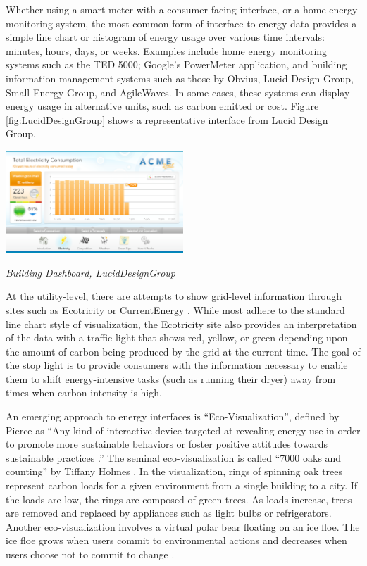 Whether using a smart meter with a consumer-facing interface, or a home
energy monitoring system, the most common form of interface to energy data
provides a simple line chart or histogram of energy usage over various time
intervals: minutes, hours, days, or weeks.  Examples include home energy
monitoring systems such as the TED 5000; Google's PowerMeter application,
and building information management systems such as those by Obvius, Lucid
Design Group, Small Energy Group, and AgileWaves. In some cases, these
systems can display energy usage in alternative units, such as carbon
emitted or cost.  Figure \ref{fig:LucidDesignGroup} shows a representative
interface from Lucid Design Group.

\begin{floatingfigure}[l]{3.25in}
  \center
  \includegraphics[width=0.5\textwidth]{luciddesigngroup.3.eps}
  \caption{\em \small Building Dashboard, LucidDesignGroup}
  \label{fig:LucidDesignGroup}
\end{floatingfigure} 


At the utility-level, there are attempts to show grid-level information
through sites such as Ecotricity \cite{Ecotricity} or CurrentEnergy
\cite{CurrentEnergy}.  While most adhere to the standard line chart style
of visualization, the Ecotricity site also provides an interpretation of
the data with a  traffic light that shows red, yellow, or green depending upon
the amount of carbon being produced by the grid at the current time.  The
goal of the stop light is to provide consumers with the information
necessary to enable them to shift energy-intensive tasks (such as running
their dryer) away from times when carbon intensity is high.

An emerging approach to energy interfaces is ``Eco-Visualization'',
defined by Pierce as ``Any kind of interactive device targeted at
revealing energy use in order to promote more sustainable behaviors or
foster positive attitudes towards sustainable practices \cite{Pierce08}.''
The seminal eco-visualization is called ``7000 oaks and counting'' by
Tiffany Holmes \cite{Holmes07}.  In the visualization, rings of spinning
oak trees represent carbon loads for a given environment from a single
building to a city.  If the loads are low, the rings are composed of green
trees. As loads increase, trees are removed and replaced by appliances such
as light bulbs or refrigerators.  Another eco-visualization involves a
virtual polar bear floating on an ice floe. The ice floe grows when users
commit to environmental actions and decreases when users choose not to
commit to change \cite{Dillahunt08}.

